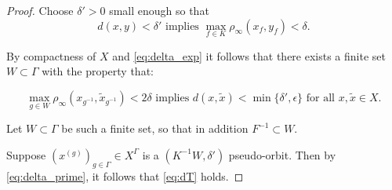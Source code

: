 \documentclass[oneside,english]{amsart}
\theoremstyle{definition}
\newcommand{\dT}{\rho_\infty}
\newcommand{\act}[2]{{#1} \curvearrowright {#2}}
\begin{document}
\begin{proof}
Choose $\delta'>0$ small enough so that
\begin{equation}\label{eq:delta_prime}
d(x,y) < \delta' \mbox{ implies } \max_{f \in K}\dT( x_f,y_f) < \delta.
\end{equation}



By compactness of $X$ and \eqref{eq:delta_exp} it follows that
there exists a finite set $W \subset \Gamma$ with the property that:

\begin{equation}\label{eq:W_delta_prime}
\max_{ g \in W}\dT( x_{g^{-1}},\tilde x_{g^{-1}}) < 2\delta \mbox{ implies } d(x,\tilde x) < \min\{\delta',\epsilon\} \mbox{ for all } x,\tilde x \in X.
\end{equation}

Let $W \subset \Gamma$ be such a finite set, so that in addition $F^{-1} \subset W$.

 Suppose $(x^{(g)})_{g \in \Gamma} \in X^\Gamma$ is a $(K^{-1}W,\delta')$ pseudo-orbit.
Then by  \eqref{eq:delta_prime}, it follows that  \eqref{eq:dT} holds.



\end{proof}
\end{document}
